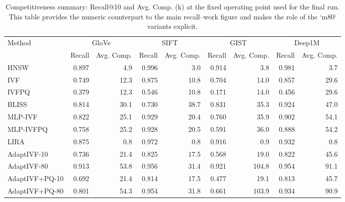 \documentclass[sigconf]{acmart}
\begin{document}
\begin{table}[!htbp]
  \centering
  \scriptsize
  \setlength{\tabcolsep}{3pt}
  \caption{Competitiveness summary: Recall@10 and Avg. Comp. (k) at the fixed operating point used for the final run. This table provides the numeric counterpart to the main recall--work figure and makes the role of the `m80` variants explicit.}
  \label{tab:appendix:comp_recall}
  \begin{tabular}{lrrrrrrrr}
    \toprule
    Method & \multicolumn{2}{c}{GloVe} & \multicolumn{2}{c}{SIFT} & \multicolumn{2}{c}{GIST} & \multicolumn{2}{c}{Deep1M} \\
    \cmidrule(lr){2-3}\cmidrule(lr){4-5}\cmidrule(lr){6-7}\cmidrule(lr){8-9}
    & Recall & Avg. Comp. & Recall & Avg. Comp. & Recall & Avg. Comp. & Recall & Avg. Comp. \\
    \midrule
    HNSW & 0.897 & 4.9 & 0.996 & 3.0 & 0.914 & 3.8 & 0.981 & 3.7 \\
    IVF & 0.749 & 12.3 & 0.875 & 10.8 & 0.704 & 14.0 & 0.857 & 29.6 \\
    IVFPQ & 0.379 & 12.3 & 0.546 & 10.8 & 0.171 & 14.0 & 0.456 & 29.6 \\
    BLISS & 0.814 & 30.1 & 0.730 & 38.7 & 0.831 & 35.3 & 0.924 & 47.0 \\
    MLP-IVF & 0.822 & 25.1 & 0.929 & 20.4 & 0.760 & 35.9 & 0.902 & 54.1 \\
    MLP-IVFPQ & 0.758 & 25.2 & 0.928 & 20.5 & 0.591 & 36.0 & 0.888 & 54.2 \\
    LIRA & 0.875 & 0.8 & 0.972 & 0.8 & 0.916 & 0.9 & 0.932 & 0.8 \\
    AdaptIVF-10 & 0.736 & 21.4 & 0.825 & 17.5 & 0.568 & 19.0 & 0.822 & 45.6 \\
    AdaptIVF-80 & 0.913 & 53.8 & 0.956 & 31.4 & 0.921 & 104.8 & 0.954 & 91.1 \\
    AdaptIVF+PQ-10 & 0.692 & 21.4 & 0.814 & 17.5 & 0.477 & 19.1 & 0.813 & 45.7 \\
    AdaptIVF+PQ-80 & 0.801 & 54.3 & 0.954 & 31.8 & 0.661 & 103.9 & 0.934 & 90.9 \\
    \bottomrule
  \end{tabular}
\end{table}
\end{document}

